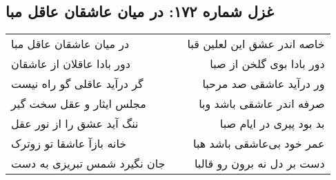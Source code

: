\begin{center}
\section*{غزل شماره ۱۷۲: در میان عاشقان عاقل مبا}
\label{sec:0172}
\begin{longtable}{l p{0.5cm} r}
در میان عاشقان عاقل مبا
&&
خاصه اندر عشق این لعلین قبا
\\
دور بادا عاقلان از عاشقان
&&
دور بادا بوی گلخن از صبا
\\
گر درآید عاقلی گو راه نیست
&&
ور درآید عاشقی صد مرحبا
\\
مجلس ایثار و عقل سخت گیر
&&
صرفه اندر عاشقی باشد وبا
\\
ننگ آید عشق را از نور عقل
&&
بد بود پیری در ایام صبا
\\
خانه بازآ عاشقا تو زوترک
&&
عمر خود بی‌عاشقی باشد هبا
\\
جان نگیرد شمس تبریزی به دست
&&
دست بر دل نه برون رو قالبا
\\
\end{longtable}
\end{center}
